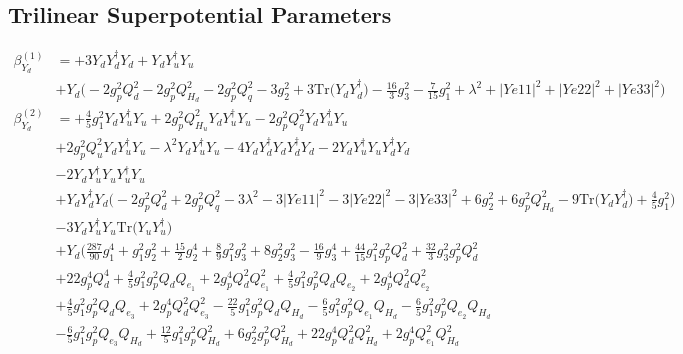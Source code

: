 \subsection{Trilinear Superpotential Parameters}
{\allowdisplaybreaks  \begin{align} 
\beta_{Y_d}^{(1)} & =  
+3 {Y_d  Y_{d}^{\dagger}  Y_d} +{Y_d  Y_{u}^{\dagger}  Y_u}\nonumber \\ 
 &+Y_d \Big(-2 g_{p}^{2} Q_{d}^{2}  -2 g_{p}^{2} Q_{H_d}^{2}  -2 g_{p}^{2} Q_{q}^{2}  -3 g_{2}^{2}  + 3 \mbox{Tr}\Big({Y_d  Y_{d}^{\dagger}}\Big)  -\frac{16}{3} g_{3}^{2}  -\frac{7}{15} g_{1}^{2}  + \lambda^{2} + |Ye11|^2 + |Ye22|^2 + |Ye33|^2\Big)\\ 
\beta_{Y_d}^{(2)} & =  
+\frac{4}{5} g_{1}^{2} {Y_d  Y_{u}^{\dagger}  Y_u} +2 g_{p}^{2} Q_{H_u}^{2} {Y_d  Y_{u}^{\dagger}  Y_u} -2 g_{p}^{2} Q_{q}^{2} {Y_d  Y_{u}^{\dagger}  Y_u} \nonumber \\ 
 &+2 g_{p}^{2} Q_{u}^{2} {Y_d  Y_{u}^{\dagger}  Y_u} - \lambda^{2} {Y_d  Y_{u}^{\dagger}  Y_u} -4 {Y_d  Y_{d}^{\dagger}  Y_d  Y_{d}^{\dagger}  Y_d} -2 {Y_d  Y_{u}^{\dagger}  Y_u  Y_{d}^{\dagger}  Y_d} \nonumber \\ 
 &-2 {Y_d  Y_{u}^{\dagger}  Y_u  Y_{u}^{\dagger}  Y_u} \nonumber \\ 
 &+{Y_d  Y_{d}^{\dagger}  Y_d} \Big(-2 g_{p}^{2} Q_{d}^{2}  + 2 g_{p}^{2} Q_{q}^{2}  -3 \lambda^{2}  -3 |Ye11|^2  -3 |Ye22|^2  -3 |Ye33|^2  + 6 g_{2}^{2}  + 6 g_{p}^{2} Q_{H_d}^{2}  -9 \mbox{Tr}\Big({Y_d  Y_{d}^{\dagger}}\Big)  + \frac{4}{5} g_{1}^{2} \Big)\nonumber \\ 
 &-3 {Y_d  Y_{u}^{\dagger}  Y_u} \mbox{Tr}\Big({Y_u  Y_{u}^{\dagger}}\Big) \nonumber \\ 
 &+Y_d \Big(\frac{287}{90} g_{1}^{4} +g_{1}^{2} g_{2}^{2} +\frac{15}{2} g_{2}^{4} +\frac{8}{9} g_{1}^{2} g_{3}^{2} +8 g_{2}^{2} g_{3}^{2} -\frac{16}{9} g_{3}^{4} +\frac{44}{15} g_{1}^{2} g_{p}^{2} Q_{d}^{2} +\frac{32}{3} g_{3}^{2} g_{p}^{2} Q_{d}^{2} \nonumber \\ 
 &+22 g_{p}^{4} Q_{d}^{4} +\frac{4}{5} g_{1}^{2} g_{p}^{2} Q_{d} Q_{e_{1}} +2 g_{p}^{4} Q_{d}^{2} Q_{e_{1}}^{2} +\frac{4}{5} g_{1}^{2} g_{p}^{2} Q_{d} Q_{e_{2}} +2 g_{p}^{4} Q_{d}^{2} Q_{e_{2}}^{2} \nonumber \\ 
 &+\frac{4}{5} g_{1}^{2} g_{p}^{2} Q_{d} Q_{e_3} +2 g_{p}^{4} Q_{d}^{2} Q_{e_3}^{2} -\frac{22}{5} g_{1}^{2} g_{p}^{2} Q_{d} Q_{H_d} -\frac{6}{5} g_{1}^{2} g_{p}^{2} Q_{e_{1}} Q_{H_d} -\frac{6}{5} g_{1}^{2} g_{p}^{2} Q_{e_{2}} Q_{H_d} \nonumber \\ 
 &-\frac{6}{5} g_{1}^{2} g_{p}^{2} Q_{e_3} Q_{H_d} +\frac{12}{5} g_{1}^{2} g_{p}^{2} Q_{H_d}^{2} +6 g_{2}^{2} g_{p}^{2} Q_{H_d}^{2} +22 g_{p}^{4} Q_{d}^{2} Q_{H_d}^{2} +2 g_{p}^{4} Q_{e_{1}}^{2} Q_{H_d}^{2} \nonumber \\ 

\end{align}}
